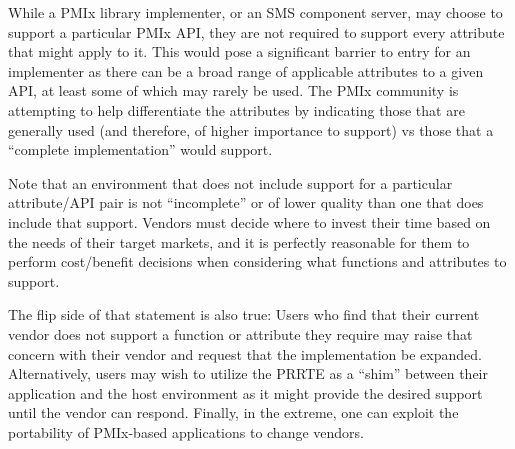 
While a \ac{PMIx} library implementer, or an \ac{SMS} component server, may choose to support a particular \ac{PMIx} \ac{API}, they are not required to support every attribute that might apply to it. This would pose a significant barrier to entry for an implementer as there can be a broad range of applicable attributes to a given \ac{API}, at least some of which may rarely be used. The \ac{PMIx} community is attempting to help differentiate the attributes by indicating those that are generally used (and therefore, of higher importance to support) vs those that a ``complete implementation'' would support.

Note that an environment that does not include support for a particular attribute/\ac{API} pair is not ``incomplete'' or of lower quality than one that does include that support. Vendors must decide where to invest their time based on the needs of their target markets, and it is perfectly reasonable for them to perform cost/benefit decisions when considering what functions and attributes to support.

The flip side of that statement is also true: Users who find that their current vendor does not support a function or attribute they require may raise that concern with their vendor and request that the implementation be expanded. Alternatively, users may wish to utilize the \ac{PRRTE} as a ``shim'' between their application and the host environment as it might provide the desired support until the vendor can respond. Finally, in the extreme, one can exploit the portability of PMIx-based applications to change vendors.

\subsection{}


